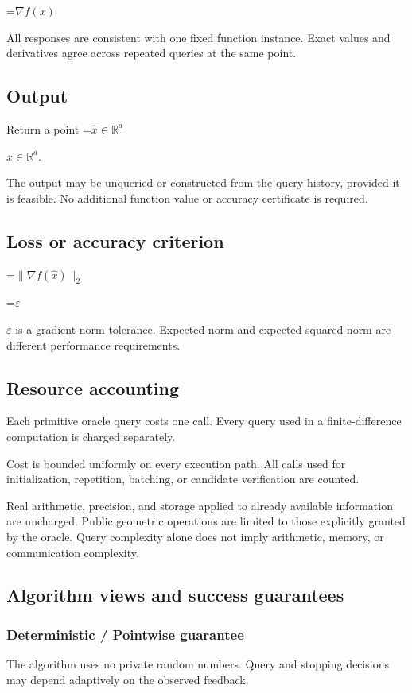 \documentclass[10pt,a4paper]{article}
\newcommand{\AtlasMath}[1]{\par\begingroup\centering\setbox0=\hbox{$\displaystyle #1$}\ifdim\wd0>1.4\linewidth\typeout{ATLAS WIDE FORMULA: \the\wd0}\fi\ifdim\wd0>\linewidth\resizebox{\linewidth}{!}{\box0}\else\box0\fi\par\endgroup}
\newcommand{\AtlasInlineMath}[1]{\begingroup\setbox0=\hbox{$#1$}\ifdim\wd0>.4\linewidth\endgroup\AtlasMath{#1}\else\endgroup$#1$\fi}
\begin{document}
\AtlasMath{\nabla f(x)}


All responses are consistent with one fixed function instance. Exact values and derivatives agree across repeated queries at the same point.

\subsection{Output}
Return a point \AtlasInlineMath{\widehat x\in\mathbb R^d}.

The output may be unqueried or constructed from the query history, provided it is feasible. No additional function value or accuracy certificate is required.

\subsection{Loss or accuracy criterion}

\AtlasMath{\|\nabla f(\widehat{x})\|_2}


\AtlasInlineMath{\varepsilon} is a gradient-norm tolerance. Expected norm and expected squared norm are different performance requirements.

\subsection{Resource accounting}
Each primitive oracle query costs one call. Every query used in a finite-difference computation is charged separately.

Cost is bounded uniformly on every execution path. All calls used for initialization, repetition, batching, or candidate verification are counted.

Real arithmetic, precision, and storage applied to already available information are uncharged. Public geometric operations are limited to those explicitly granted by the oracle. Query complexity alone does not imply arithmetic, memory, or communication complexity.

\subsection{Algorithm views and success guarantees}
\subsubsection{Deterministic / Pointwise guarantee}
The algorithm uses no private random numbers. Query and stopping decisions may depend adaptively on the observed feedback.
\end{document}
